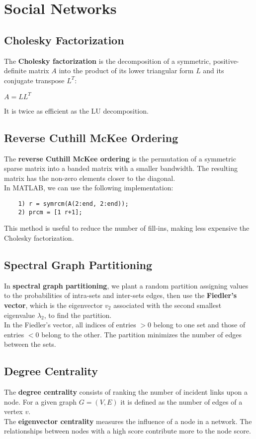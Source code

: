 \documentclass{article}
\begin{document}
\newpage

\section{Social Networks}
\subsection{Cholesky Factorization}
The \textbf{Cholesky factorization} is the decomposition of a symmetric, positive-definite matrix $A$ into the product of its lower triangular form $L$ and its conjugate transpose $L^T$:
\begin{center}
    $A = LL^T$
\end{center}
It is twice as efficient as the LU decomposition. 
\subsection{Reverse Cuthill McKee Ordering}
The \textbf{reverse Cuthill McKee ordering} is the permutation of a symmetric sparse matrix into a banded matrix with a smaller bandwidth. The resulting matrix has the non-zero elements closer to the diagonal. \\
In MATLAB, we can use the following implementation:
\begin{verbatim}
    1) r = symrcm(A(2:end, 2:end));
    2) prcm = [1 r+1];
\end{verbatim}
This method is useful to reduce the number of fill-ins, making less expensive the Cholesky factorization.
\subsection{Spectral Graph Partitioning}
In \textbf{spectral graph partitioning}, we plant a random partition assigning values to the probabilities of intra-sets and inter-sets edges, then use the \textbf{Fiedler's vector}, which is the eigenvector $v_2$ associated with the second smallest eigenvalue $\lambda_2$, to find the partition. \\
In the Fiedler's vector, all indices of entries $ > 0$ belong to one set and those of entries $< 0$ belong to the other. The partition minimizes the number of edges between the sets.
\subsection{Degree Centrality}
The \textbf{degree centrality} consists of ranking the number of incident links upon a node. For a given graph $G = (V,E)$ it is defined as the number of edges of a vertex $v$. \\
The \textbf{eigenvector centrality} measures the influence of a node in a network. The relationships between nodes with a high score contribute more to the node score.
\end{document}
